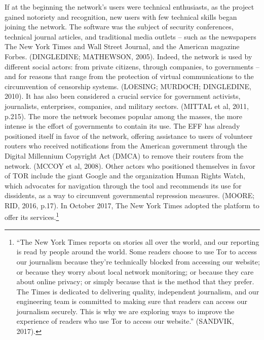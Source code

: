 If at the beginning the network's users were technical enthusiasts, as the project gained notoriety and recognition, new users with few technical skills began joining the network. The software was the subject of security conferences, technical journal articles, and traditional media outlets -- such as the newspapers The New York Times and Wall Street Journal, and the American magazine Forbes. (DINGLEDINE; MATHEWSON, 2005). Indeed, the network is used by different social actors: from private citizens, through companies, to governments -- and for reasons that range from the protection of virtual communications to the circumvention of censorship systems. (LOESING; MURDOCH; DINGLEDINE, 2010). It has also been considered a crucial service for government activists, journalists, enterprises, companies, and military sectors. (MITTAL et al, 2011, p.215). The more the network becomes popular among the masses, the more intense is the effort of governments to contain its use. The EFF has already positioned itself in favor of the network, offering assistance to users of volunteer routers who received notifications from the American government through the Digital Millennium Copyright Act (DMCA) to remove their routers from the network. (MCCOY et al, 2008). Other actors who positioned themselves in favor of TOR include the giant Google and the organization Human Rights Watch, which advocates for navigation through the tool and recommends its use for dissidents, as a way to circumvent governmental repression measures. (MOORE; RID, 2016, p.17). In October 2017, The New York Times adopted the platform to offer its services.\footnote{``The New York Times reports on stories all over the world, and our reporting is read by people around the world. Some readers choose to use Tor to access our journalism because they're technically blocked from accessing our website; or because they worry about local network monitoring; or because they care about online privacy; or simply because that is the method that they prefer. The Times is dedicated to delivering quality, independent journalism, and our engineering team is committed to making sure that readers can access our journalism securely. This is why we are exploring ways to improve the experience of readers who use Tor to access our website.'' (SANDVIK, 2017).}

